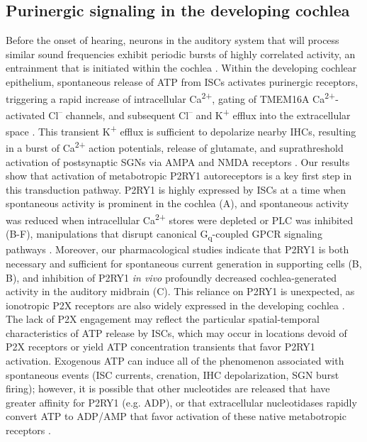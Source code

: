 \documentclass[9pt,lineno]{elife}
\begin{document}
\subsection{Purinergic signaling in the developing cochlea}
Before the onset of hearing, neurons in the auditory system that will process similar sound frequencies exhibit periodic bursts of highly correlated activity, an entrainment that is initiated within the cochlea \citep{Babola2018,Clause2014,Sonntag2009,Tritsch2010a}. Within the developing cochlear epithelium, spontaneous release of ATP from ISCs activates purinergic receptors, triggering a rapid increase of intracellular Ca\textsuperscript{2+}, gating of TMEM16A Ca\textsuperscript{2+}-activated Cl\textsuperscript{--} channels, and subsequent Cl\textsuperscript{--} and K\textsuperscript{+} efflux into the extracellular space \citep{Tritsch2007,Wang2015}. This transient K\textsuperscript{+} efflux is sufficient to depolarize nearby IHCs, resulting in a burst of Ca\textsuperscript{2+} action potentials, release of glutamate, and suprathreshold activation of postsynaptic SGNs via AMPA and NMDA receptors \citep{Tritsch2010a,Zhang-Hooks2016}. Our results show that activation of metabotropic P2RY1 autoreceptors is a key first step in this transduction pathway. P2RY1 is highly expressed by ISCs at a time when spontaneous activity is prominent in the cochlea \citep{Scheffer2015,Tritsch2010} (A), and spontaneous activity was reduced when intracellular Ca\textsuperscript{2+} stores were depleted or PLC was inhibited (B-F), manipulations that disrupt canonical G\textsubscript{q}-coupled GPCR signaling pathways \citep{Erb2012, Fabre1999}. Moreover, our pharmacological studies indicate that P2RY1 is both necessary and sufficient for spontaneous current generation in supporting cells (B, B), and inhibition of P2RY1 \textit{in vivo} profoundly decreased cochlea-generated activity in the auditory midbrain (C). This reliance on P2RY1 is unexpected, as ionotropic P2X receptors are also widely expressed in the developing cochlea \citep{Brandle1999,Lahne2008,Liu2015,Nikolic2003,Scheffer2015,Tritsch2007}. The lack of P2X engagement may reflect the particular spatial-temporal characteristics of ATP release by ISCs, which may occur in locations devoid of P2X receptors or yield ATP concentration transients that favor P2RY1 activation. Exogenous ATP can induce all of the phenomenon associated with spontaneous events (ISC currents, crenation, IHC depolarization, SGN burst firing); however, it is possible that other nucleotides are released that have greater affinity for P2RY1 (e.g. ADP), or that extracellular nucleotidases rapidly convert ATP to ADP/AMP that favor activation of these native metabotropic receptors \citep{VonKugelgen2006a,Vlajkovic1998,Vlajkovic2002}. 
\end{document}

